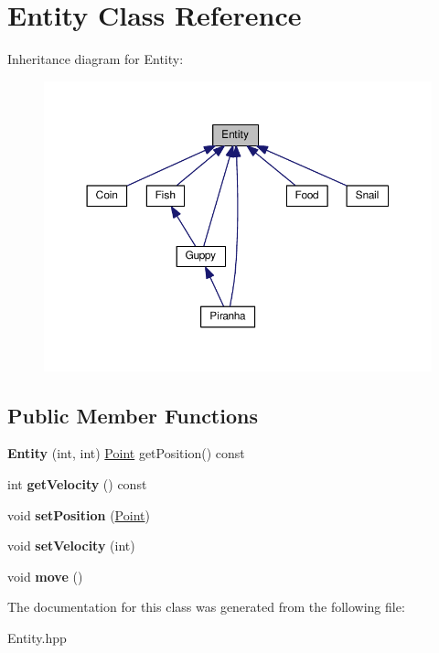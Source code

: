 \hypertarget{classEntity}{}\section{Entity Class Reference}
\label{classEntity}


Inheritance diagram for Entity\+:
\nopagebreak
\begin{figure}[H]
\begin{center}
\leavevmode
\includegraphics[width=350pt]{classEntity__inherit__graph}
\end{center}
\end{figure}
\subsection*{Public Member Functions}
\begin{DoxyCompactItemize}
\item 
\mbox{\label{classEntity_a82c4f38635d70e83cbf17332e2abddc6}} 
{\bfseries Entity} (int, int) \hyperlink{classPoint}{Point} get\+Position() const
\item 
\mbox{\label{classEntity_ac8e667975506fcad1d4d3f0715c4df51}} 
int {\bfseries get\+Velocity} () const
\item 
\mbox{\label{classEntity_a1b9a6d2e14faa42afeea2b57218285fd}} 
void {\bfseries set\+Position} (\hyperlink{classPoint}{Point})
\item 
\mbox{\label{classEntity_ab91bc74ca735bc2172d4eac1ed79ed2a}} 
void {\bfseries set\+Velocity} (int)
\item 
\mbox{\label{classEntity_ac1f12a5f7922624ee7ced15be3b884de}} 
void {\bfseries move} ()
\end{DoxyCompactItemize}


The documentation for this class was generated from the following file\+:\begin{DoxyCompactItemize}
\item 
Entity.\+hpp\end{DoxyCompactItemize}
